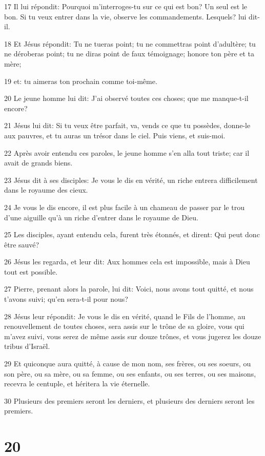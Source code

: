 \par 17 Il lui répondit: Pourquoi m'interroges-tu sur ce qui est bon? Un seul est le bon. Si tu veux entrer dans la vie, observe les commandements. Lesquels? lui dit-il.
\par 18 Et Jésus répondit: Tu ne tueras point; tu ne commettras point d'adultère; tu ne déroberas point; tu ne diras point de faux témoignage; honore ton père et ta mère;
\par 19 et: tu aimeras ton prochain comme toi-même.
\par 20 Le jeune homme lui dit: J'ai observé toutes ces choses; que me manque-t-il encore?
\par 21 Jésus lui dit: Si tu veux être parfait, va, vends ce que tu possèdes, donne-le aux pauvres, et tu auras un trésor dans le ciel. Puis viens, et suis-moi.
\par 22 Après avoir entendu ces paroles, le jeune homme s'en alla tout triste; car il avait de grands biens.
\par 23 Jésus dit à ses disciples: Je vous le dis en vérité, un riche entrera difficilement dans le royaume des cieux.
\par 24 Je vous le dis encore, il est plus facile à un chameau de passer par le trou d'une aiguille qu'à un riche d'entrer dans le royaume de Dieu.
\par 25 Les disciples, ayant entendu cela, furent très étonnés, et dirent: Qui peut donc être sauvé?
\par 26 Jésus les regarda, et leur dit: Aux hommes cela est impossible, mais à Dieu tout est possible.
\par 27 Pierre, prenant alors la parole, lui dit: Voici, nous avons tout quitté, et nous t'avons suivi; qu'en sera-t-il pour nous?
\par 28 Jésus leur répondit: Je vous le dis en vérité, quand le Fils de l'homme, au renouvellement de toutes choses, sera assis sur le trône de sa gloire, vous qui m'avez suivi, vous serez de même assis sur douze trônes, et vous jugerez les douze tribus d'Israël.
\par 29 Et quiconque aura quitté, à cause de mon nom, ses frères, ou ses soeurs, ou son père, ou sa mère, ou sa femme, ou ses enfants, ou ses terres, ou ses maisons, recevra le centuple, et héritera la vie éternelle.
\par 30 Plusieurs des premiers seront les derniers, et plusieurs des derniers seront les premiers.

\chapter{20}

